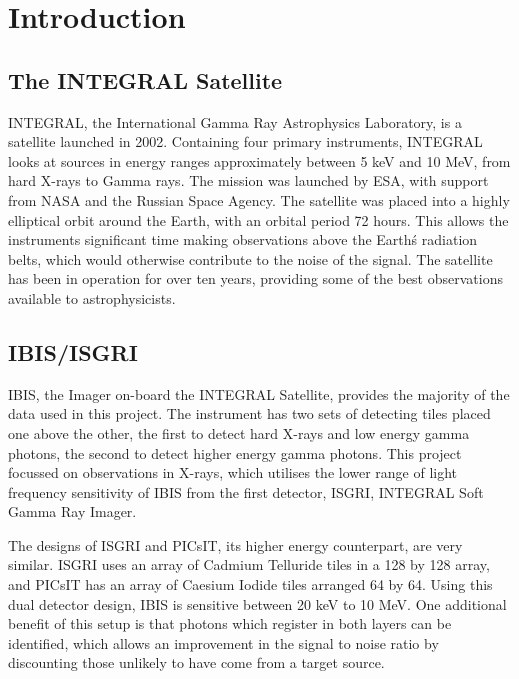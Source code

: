 
\chapter{Introduction} %

\label{ch:introduction} %


\section{The INTEGRAL Satellite}
INTEGRAL, the International Gamma Ray Astrophysics Laboratory, is a satellite launched in 2002. Containing four primary instruments, INTEGRAL looks at sources in energy ranges approximately between 5 keV and 10 MeV, from hard X-rays to Gamma rays. The mission was launched by ESA, with support from NASA and the Russian Space Agency. The satellite was placed into a highly elliptical orbit around the Earth, with an orbital period 72 hours. This allows the instruments significant time making observations above the Earth\'s radiation belts, which would otherwise contribute to the noise of the signal. The satellite has been in operation for over ten years, providing some of the best observations available to astrophysicists.

\section{IBIS/ISGRI}
IBIS, the Imager on-board the INTEGRAL Satellite, provides the majority of the data used in this project. The instrument has two sets of detecting tiles placed one above the other, the first to detect hard X-rays and low energy gamma photons, the second to detect higher energy gamma photons. This project focussed on observations in X-rays, which utilises the lower range of light frequency sensitivity of IBIS from the first detector, ISGRI, INTEGRAL Soft Gamma Ray Imager.

The designs of ISGRI and PICsIT, its higher energy counterpart, are very similar. ISGRI uses an array of Cadmium Telluride tiles in a 128 by 128 array, and PICsIT has an array of Caesium Iodide tiles arranged 64 by 64. Using this dual detector design, IBIS is sensitive between 20 keV to 10 MeV. One additional benefit of this setup is that photons which register in both layers can be identified, which allows an improvement in the signal to noise ratio by discounting those unlikely to have come from a target source.

